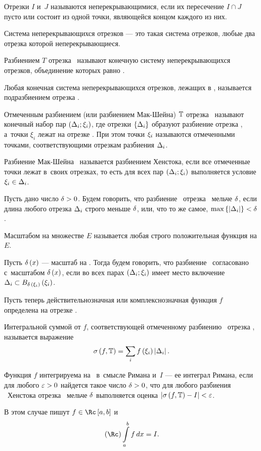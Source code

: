 \documentclass[draft]{article}
\begin{document}
\df Отрезки $I$ и~$J$ называются неперекрывающимися, если их
пересечение $I \cap J$ пусто или состоит из одной точки, являющейся
концом каждого из них.

\df Система неперекрывающихся отрезков --- это такая система
отрезков, любые два отрезка которой неперекрывающиеся.

\df Разбиением $T$ отрезка \ab\ называют конечную систему
неперекрывающихся отрезков, объединение которых равно \ab.

\df Любая конечная система неперекрывающихся отрезков, лежащих в
\ab, называется подразбиением отрезка \ab.

\df Отмеченным разбиением (или разбиением Мак-Шейна) $\mathbb{T}$ отрезка
\ab\ называют конечный набор пар $\dixi$, где отрезки
$\left\{\Delta_i\right\}$ образуют разбиение отрезка \ab, а~точки $\xi_i$
лежат на отрезке \ab. При этом точки $\xi_i$ называются отмеченными
точками, соответствующими отрезкам разбиения $\Delta_i$.

\df Разбиение Мак-Шейна \Tdixif\ называется разбиением Хенстока,
если все отмеченные точки лежат в~своих отрезках, то есть для всех
пар $\dixi$ выполняется условие $\xi_i\in\Delta_i$.

\df Пусть дано число $\delta > 0$. Будем говорить, что разбиение \Tdixif\
отрезка \ab\ мельче $\delta$, если длина любого отрезка $\Delta_i$ строго
меньше $\delta$, или, что то же самое, $\max \left\{\left|\Delta_i\right|\right\}<\delta$.

\df Масштабом на множестве $E$ называется любая строго положительная
функция на $E$.

\df Пусть $\dex$ --- масштаб на \ab. Тогда будем говорить, что
разбиение \Tdixif\ согласовано с~масштабом $\dex$, если во всех
парах $\dixi$ имеет место включение $\dei\subset
B_{\de\,\at(\xi_{ i} )}\at(\xii)$.

\bigskip

Пусть теперь действительнозначная или комплекснозначная функция $f$
определена на отрезке \ab.

\bigskip

\df Интегральной суммой от $f$, соответствующей отмеченному
разбиению \Tdixif\ отрезка \ab, называется выражение
$$\isfT=\sumi\fxildi.$$

\df Функция $f$ интегрируема на \ab\ в~смысле Римана и~$I$ --- ее
интеграл Римана, если для любого $\varepsilon > 0$ найдется такое число
$\delta > 0$, что для любого разбиения \Tdixif\ Хенстока отрезка \ab\
мельче $\delta$ выполняется оценка $\left|\isfT-I\right|<\ep$.

В этом случае пишут $f\isriman[a,b]$ и~$$\riman\intabfdx=I.$$
\end{document}
